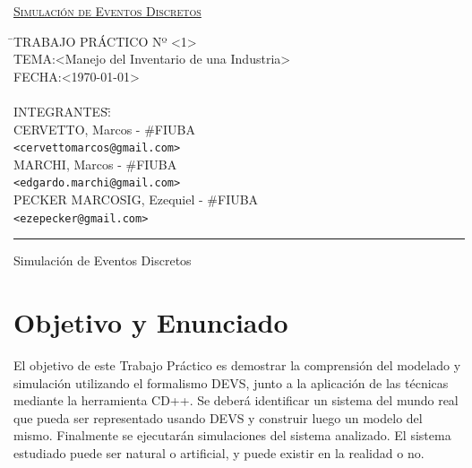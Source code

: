 \documentclass[10pt]{article}
\begin{document}
\begin{titlepage}
\vfill

\begin{center} %
\Large{\underline{\textsc{Simulación de Eventos Discretos}}}
\end{center}

\vfill

\begin{tabbing}
\hspace{2cm}\=\+TRABAJO PRÁCTICO Nº \textless{}1\textgreater{}\\
	TEMA:\textless{}Manejo del Inventario de una Industria\textgreater{}\\
	FECHA:\textless{\today}\textgreater{}\\
\\
	INTEGRANTES:\hspace{-1cm}\=\+\hspace{1cm}\=\hspace{6cm}\=\\
		CERVETTO, Marcos	\>\>- \#FIUBA\\
			\>\footnotesize{\verb!<cervettomarcos@gmail.com>!}\\
		MARCHI, Marcos	\>\>- \#FIUBA\\
			\>\footnotesize{\verb!<edgardo.marchi@gmail.com>!}\\
		PECKER MARCOSIG, Ezequiel	\>\>- \#FIUBA\\
			\>\footnotesize{\verb!<ezepecker@gmail.com>!}\\
\end{tabbing}

\vfill

\hrule
\vspace{0.2cm}

\noindent\small{Simulación de Eventos Discretos}

\end{titlepage}

%
%
\setcounter{page}{1}

%
%
\tableofcontents
\newpage

%
%

\section{Objetivo y Enunciado}
El objetivo de este Trabajo Práctico es demostrar la comprensión del modelado y simulación utilizando el formalismo DEVS, junto a la aplicación de las técnicas mediante la herramienta CD++.
Se deberá identificar un sistema del mundo real que pueda ser representado usando DEVS y construir luego un modelo del mismo.
Finalmente se ejecutarán simulaciones del sistema analizado. El sistema estudiado puede ser natural o artificial, y puede existir en la realidad o no.
\end{document}
